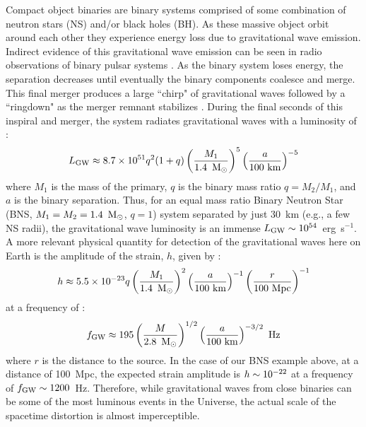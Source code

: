 Compact object binaries are binary systems comprised of some combination of neutron stars (NS) and/or black holes (BH). As these massive object orbit around each other they experience energy loss due to gravitational wave emission. Indirect evidence of this gravitational wave emission can be seen in radio observations of binary pulsar systems \citep{HulseTaylor75,Weisberg+05}. As the binary system loses energy, the separation decreases until eventually the binary components coalesce and merge. This final merger produces a large ``chirp" of gravitational waves followed by a ``ringdown" as the merger remnant stabilizes \citep{Centrella+10}. During the final seconds of this inspiral and merger, the system radiates gravitational waves with a luminosity of \citep{FaberRasio12}:
\begin{equation}
\label{eq:intro_gwlum}
L_{\rm GW} \approx 8.7 \times 10^{51} q^2 (1+q) \left ( \frac{M_1}{1.4~\msun} \right )^5 \left ( \frac{a}{100~{\rm km}} \right )^{-5}
\end{equation}
\noindent where $M_1$ is the mass of the primary, $q$ is the binary mass ratio $q = M_2 / M_1$, and $a$ is the binary separation. Thus, for an equal mass ratio Binary Neutron Star (BNS, $M_1 = M_2 = 1.4~{\rm\,M_\odot}$, $q = 1$) system separated by just 30~km (e.g., a few NS radii), the gravitational wave luminosity is an immense $L_{\rm GW} \sim 10^{54}$~erg~s$^{-1}$. A more relevant physical quantity for detection of the gravitational waves here on Earth is the amplitude of the strain, $h$, given by \citep{FaberRasio12}:
\begin{equation}
\label{eq:intro_gwh}
h \approx 5.5 \times 10^{-23} q \left ( \frac{M_1}{1.4~\msun} \right )^2 \left ( \frac{a}{100~{\rm km}} \right )^{-1} \left ( \frac{r}{100~{\rm Mpc}} \right )^{-1}
\end{equation}
\noindent at a frequency of \citep{FaberRasio12}:
\begin{equation}
\label{eq:intro_gwf}
f_{\rm GW} \approx 195 \left ( \frac{M}{2.8~\msun} \right )^{1/2} \left ( \frac{a}{100~{\rm km}} \right )^{-3/2}~{\rm Hz}
\end{equation}
\noindent where $r$ is the distance to the source. In the case of our BNS example above, at a distance of 100~Mpc, the expected strain amplitude is $h \sim 10^{-22}$ at a frequency of $f_{\rm GW} \sim 1200$~Hz. Therefore, while gravitational waves from close binaries can be some of the most luminous events in the Universe, the actual scale of the spacetime distortion is almost imperceptible.


